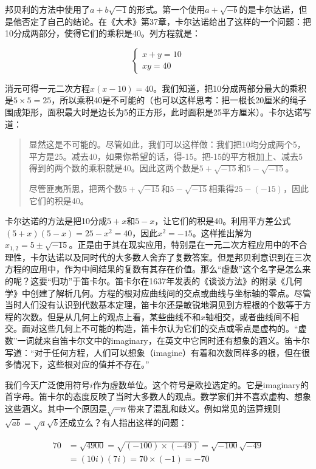 \documentclass[b5paper]{ctexart}
\begin{document}
邦贝利的方法中使用了$a + b\sqrt{-1}$的形式。第一个使用$a + \sqrt{-b}$的是卡尔达诺，但是他否定了自己的结论。在《大术》第37章，卡尔达诺给出了这样的一个问题：把10分成两部分，使得它们的乘积是40。列方程就是：

\[
\begin{cases}
x + y = 10 \\
xy = 40
\end{cases}
\]

消元可得一元二次方程$x(x-10) = 40$。我们知道，把10分成两部分最大的乘积是$5 \times 5 = 25$，所以乘积40是不可能的（也可以这样思考：把一根长20厘米的绳子围成矩形，面积最大时是边长为5的正方形，此时面积是25平方厘米）。卡尔达诺写道：

\begin{quotation}
显然这是不可能的。尽管如此，我们可以这样做：我们把10均分成两个5，平方是25。减去40，如果你希望的话，得-15。把-15的平方根加上、减去5得到的两个数的乘积就是40。因此这两个数是$5 + \sqrt{-15}$和$5 - \sqrt{-15}$。

尽管匪夷所思，把两个数$5 + \sqrt{-15}$和$5 - \sqrt{-15}$相乘得$25-(-15)$，因此它们的积是40。
\end{quotation}

卡尔达诺的方法是把10分成$5 + x$和$5 - x$，让它们的积是40。利用平方差公式$(5 + x)(5 - x) = 25 - x^2 = 40$，因此$x^2 = -15$。这样推出解为$x_{1, 2} = 5 \pm \sqrt{-15}$。正是由于其在现实应用，特别是在一元二次方程应用中的不合理性，卡尔达诺以及同时代的大多数人舍弃了复数答案。但是邦贝利意识到在三次方程的应用中，作为中间结果的复数有其存在价值。那么“虚数”这个名字是怎么来的呢？这要“归功”于笛卡尔。笛卡尔在1637年发表的《谈谈方法》的附录《几何学》中创建了解析几何。方程的根对应曲线间的交点或曲线与坐标轴的零点。尽管当时人们没有认识到代数基本定理，笛卡尔还是敏锐地洞见到方程根的个数等于方程的次数。但是从几何上的观点上看，某些曲线不和$x$轴相交，或者曲线间不相交。面对这些几何上不可能的构造，笛卡尔认为它们的交点或零点是虚构的。“虚数”一词就来自笛卡尔文中的imaginary，在英文中它同时还有想象的涵义。笛卡尔写道：“对于任何方程，人们可以想象（imagine）有着和次数同样多的根，但在很多情况下，这些根对应的值并不存在。”

我们今天广泛使用符号$i$作为虚数单位。这个符号是欧拉选定的。它是imaginary的首字母。笛卡尔的态度反映了当时大多数人的观点。数学家们并不喜欢虚构、想象这些涵义。其中一个原因是$\sqrt{-n}$带来了混乱和歧义。例如常见的运算规则$\sqrt{ab} = \sqrt{a}\sqrt{b}$还成立么？有人指出这样的问题：

\begin{align*}
70 &= \sqrt{4900} = \sqrt{(-100)\times(-49)} = \sqrt{-100}\sqrt{-49} \\
   &= (10i)(7i) = 70 \times (-1) = -70
\end{align*}
\end{document}
